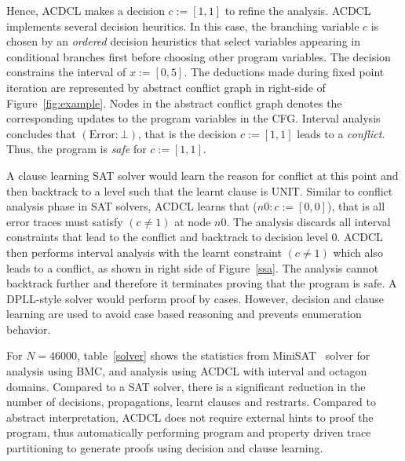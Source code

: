 Hence, ACDCL makes a decision $c:=[1,1]$ to refine the analysis.  
ACDCL implements several decision heuritics.  In this case, the 
branching variable $c$ is chosen by an {\em ordered} decision 
heuristics that select variables appearing in conditional branches 
first before choosing other program variables. 
The decision constrains the interval of $x:=[0,5]$.  The deductions made 
during fixed point iteration are represented by abstract conflict 
graph in right-side of Figure~\ref{fig:example}.  Nodes in the abstract 
conflict graph denotes the corresponding updates to the program 
variables in the CFG.  Interval analysis concludes that $(\text{Error}:\bot)$, that 
is the decision $c:=[1,1]$ leads to a {\em conflict}.  Thus, 
the program is {\em safe} for $c:=[1,1]$.  

A clause learning SAT solver would learn the reason for conflict at this 
point and then backtrack to a level such that the learnt clause is UNIT.  
Similar to conflict analysis phase in SAT solvers, ACDCL learns that 
(\(n0: c:=[0,0]\)), that is all error traces must satisfy $(c \neq 1)$ 
at node $n0$.  The analysis discards all interval constraints that
lead to the conflict and backtrack to decision level 0.  ACDCL then 
performs interval analysis with the learnt constraint $(c \neq 1)$ which also 
leads to a conflict, as shown in right side of Figure~\ref{ssa}.  The 
analysis cannot backtrack further and therefore it terminates proving 
that the program is safe.  A DPLL-style solver would perform proof by 
cases.  However, decision and clause learning are used to avoid case 
based reasoning and prevents enumeration behavior.     
   
For $N=46000$, table~\ref{solver} shows the statistics from 
MiniSAT~\cite{minisat} solver for analysis using BMC, and 
analysis using ACDCL with interval and octagon domains.  
Compared to a SAT solver, there is a significant reduction 
in the number of decisions, propagations, learnt clauses and 
restrarts.  Compared to abstract interpretation, ACDCL does 
not require external hints to proof the program, thus 
automatically performing program and property driven trace 
partitioning to generate proofs using decision and clause learning.  
